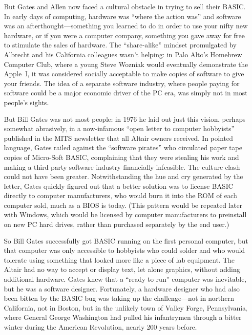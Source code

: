 But Gates and Allen now faced a cultural obstacle in trying to sell their
BASIC.
In early days of computing, hardware was ``where the action was'' and
software was an afterthought---something you learned to do in order to
use your nifty new hardware, or if you were a computer company,
something you gave away for free to stimulate the sales of hardware.
The ``share-alike'' mindset promulgated by Albrecht and his California
colleagues wasn't helping:
in Palo Alto's Homebrew
Computer Club, where a young Steve Wozniak would
eventually demonstrate the Apple~I, it
was considered socially acceptable to
make copies of software  to give your friends.
The idea of a separate software industry, where
people paying for software could be a major economic driver of the PC era,
was simply not in most people's sights.  

But Bill Gates was not most people: in 1976 he laid out just this vision,
perhaps somewhat abrasively, in a now-infamous ``open letter to computer
hobbyists'' published in the 
MITS newsletter that all Altair owners received.
In pointed language, Gates railed against the ``software pirates'' who
circulated paper tape copies of Micro-Soft BASIC, complaining that they
were stealing 
his work and making a third-party software industry financially
infeasible.
The culture clash could not have been greater.
Notwithstanding the hue and cry generated by the letter, Gates
quickly figured out that a better solution was to license BASIC directly
to computer manufacturers, who would burn it into the ROM of each
computer sold, much as a BIOS is today.
(This pattern would be repeated later with Windows, which would be
licensed by computer manufacturers to preinstall on new PC hard drives,
rather than purchased separately by the end user.)

So Bill Gates successfully got BASIC running on the first personal computer, but that computer was only
accessible to hobbyists who could solder and who would tolerate using
something that looked more like a piece of lab equipment.  The Altair had no way
to accept or display text, let alone graphics, without adding additional
hardware. 
Gates knew that a ``ready-to-run'' computer was inevitable, but he was a
software designer.  Fortunately, a hardware designer who had also been
bitten by the BASIC bug was taking up the challenge---not in northern
California, not in Boston, but in the unlikely town of Valley Forge,
Pennsylvania, where General George Washington had pulled his infantrymen
through a bitter winter during the American Revolution, nearly 200 years before.


